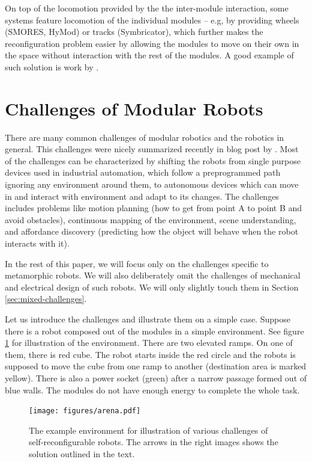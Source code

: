 On top of the locomotion provided by the the inter-module interaction, some
systems feature locomotion of the individual modules -- e.g, by providing wheels
(SMORES, HyMod) or tracks (Symbricator), which further makes the reconfiguration
problem easier by allowing the modules to move on their own in the space without
interaction with the rest of the modules. A good example of such solution is
work by \textcite{DBLP:journals/ral/LiuWY19}.

\section{Challenges of Modular Robots}

There are many common challenges of modular robotics and the robotics in
general. This challenges were nicely summarized recently in blog post by
\textcite{locklin_2020}. Most of the challenges can be characterized by shifting
the robots from single purpose devices used in industrial automation, which
follow a preprogrammed path ignoring any environment around them, to autonomous
devices which can move in and interact with environment and adapt to its
changes. The challenges includes problems like motion planning (how to get from
point A to point B and avoid obstacles), continuous mapping of the environment,
scene understanding, and affordance discovery (predicting how the object will
behave when the robot interacts with it).

In the rest of this paper, we will focus only on the challenges specific to
metamorphic robots. We will also deliberately omit the challenges of mechanical
and electrical design of such robots. We will only slightly touch them in
Section \ref{sec:mixed-challenges}.

Let us introduce the challenges and illustrate them on a simple case. Suppose
there is a robot composed out of the modules in a simple environment. See figure
\ref{fig:arena} for illustration of the environment. There are two elevated
ramps. On one of them, there is red cube. The robot starts inside the red circle
and the robots is supposed to move the cube from one ramp to another
(destination area is marked yellow). There is also a power socket (green) after
a narrow passage formed out of blue walls. The modules do not have enough energy
to complete the whole task.

\begin{figure}[!t]
    \centering
    \texttt{[image: figures/arena.pdf]}
    \caption{The example environment for illustration of various challenges of
    self-reconfigurable robots. The arrows in the right images shows the
    solution outlined in the text.}
    \label{fig:arena}
\end{figure}

